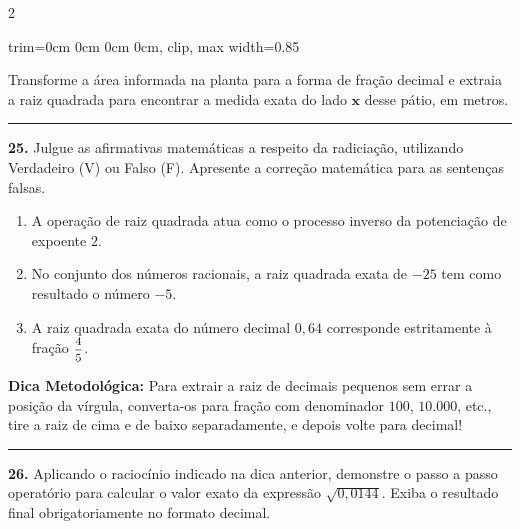 \documentclass[twoside, 10pt, a4paper]{article}
\newlength{\espacoPreQuestao}\setlength{\espacoPreQuestao}{0.1cm}
\newlength{\espacoQuestao}\setlength{\espacoQuestao}{0.2cm}
\newcommand{\larguraTikz}{0.85\linewidth}
\begin{document}
\begin{multicols*}{2}
\begin{center}
\begin{adjustbox}{trim=0cm 0cm 0cm 0cm, clip, max width=\larguraTikz}
\end{adjustbox}
\end{center}
Transforme a área informada na planta para a forma de fração decimal e extraia a raiz quadrada para encontrar a medida exata do lado $ \textbf{x} $ desse pátio, em metros.
\par\vspace{\espacoQuestao}

\noindent\textcolor{CorLinha}{\rule{\linewidth}{0.5pt}} 
\par\vspace{\espacoPreQuestao}
\textbf{25.} Julgue as afirmativas matemáticas a respeito da radiciação, utilizando Verdadeiro (V) ou Falso (F). Apresente a correção matemática para as sentenças falsas.
\begin{enumerate}[label=\Roman*.]
    \item A operação de raiz quadrada atua como o processo inverso da potenciação de expoente $ 2 $.
    \item No conjunto dos números racionais, a raiz quadrada exata de $ -25 $ tem como resultado o número $ -5 $.
    \item A raiz quadrada exata do número decimal $ 0,64 $ corresponde estritamente à fração $ \mfrac{4}{5} $.
\end{enumerate}
\par\vspace{\espacoQuestao}

\begin{boxdica}
\textbf{Dica Metodológica:} Para extrair a raiz de decimais pequenos sem errar a posição da vírgula, converta-os para fração com denominador $ 100 $, $ 10.000 $, etc., tire a raiz de cima e de baixo separadamente, e depois volte para decimal!
\end{boxdica}

\noindent\textcolor{CorLinha}{\rule{\linewidth}{0.5pt}} 
\par\vspace{\espacoPreQuestao}
\textbf{26.} Aplicando o raciocínio indicado na dica anterior, demonstre o passo a passo operatório para calcular o valor exato da expressão $ \sqrt{0,0144} $. Exiba o resultado final obrigatoriamente no formato decimal.
\par\vspace{\espacoQuestao}


\end{multicols*}
\end{document}

